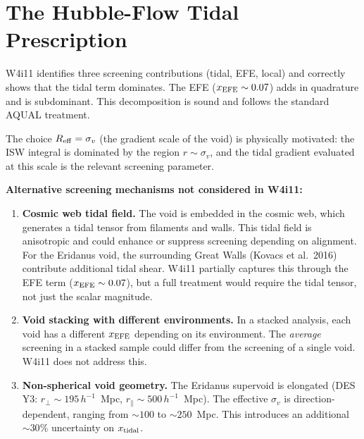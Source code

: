 \documentclass[11pt,a4paper]{article}
\begin{document}
\section{The Hubble-Flow Tidal Prescription}
\label{sec:hubble-tidal}

W4i11 identifies three screening contributions (tidal, EFE, local)
and correctly shows that the tidal term dominates. The EFE
($x_{\rm EFE} \sim 0.07$) adds in quadrature and is subdominant.
This decomposition is sound and follows the standard AQUAL treatment.

The choice $R_{\rm eff} = \sigma_v$ (the gradient scale of the void)
is physically motivated: the ISW integral is dominated by the region
$r \sim \sigma_v$, and the tidal gradient evaluated at this scale
is the relevant screening parameter.

\textbf{Alternative screening mechanisms not considered in W4i11:}

\begin{enumerate}
\item \textbf{Cosmic web tidal field.} The void is embedded in the
  cosmic web, which generates a tidal tensor from filaments and walls.
  This tidal field is anisotropic and could enhance or suppress
  screening depending on alignment. For the Eridanus void, the
  surrounding Great Walls (Kovacs et al.\ 2016) contribute
  additional tidal shear. W4i11 partially captures this through
  the EFE term ($x_{\rm EFE} \sim 0.07$), but a full treatment
  would require the tidal tensor, not just the scalar magnitude.

\item \textbf{Void stacking with different environments.} In a
  stacked analysis, each void has a different $x_{\rm EFE}$ depending
  on its environment. The \emph{average} screening in a stacked
  sample could differ from the screening of a single void.
  W4i11 does not address this.

\item \textbf{Non-spherical void geometry.} The Eridanus supervoid
  is elongated (DES Y3: $r_\perp \sim 195\,h^{-1}$~Mpc,
  $r_\parallel \sim 500\,h^{-1}$~Mpc). The effective $\sigma_v$ is
  direction-dependent, ranging from $\sim 100$ to $\sim 250$~Mpc.
  This introduces an additional $\sim 30\%$ uncertainty on
  $x_{\rm tidal}$.
\end{enumerate}
\end{document}
